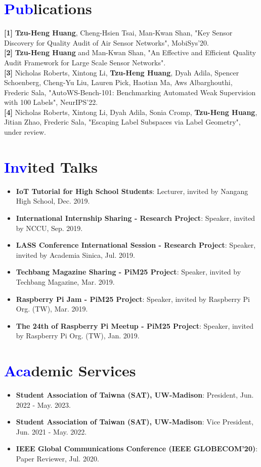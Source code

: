 \documentclass[letterpaper,11pt]{article}
\newcommand{\resumeItem}[2]{
  \item\small{
    \textbf{#1}{: #2 \vspace{-2pt}}
  }
}
\newcommand{\resumeSubItem}[2]{\resumeItem{#1}{#2}\vspace{-5pt}}
\newcommand{\resumeSubHeadingListStart}{\begin{itemize}[leftmargin=*]}
\newcommand{\resumeSubHeadingListEnd}{\end{itemize}}
\begin{document}
\section{\textbf{\textcolor{blue}{Pub}lications}}
{\textbf{[1]} \textbf{Tzu-Heng Huang}, Cheng-Hsien Tsai, Man-Kwan Shan, "Key Sensor Discovery for Quality Audit of Air Sensor Networks", MobiSys'20.} \\
{\textbf{[2]} \textbf{Tzu-Heng Huang} and Man-Kwan Shan, "An Effective and Efficient Quality Audit Framework for Large Scale Sensor Networks".} \\
{\textbf{[3]} Nicholas Roberts, Xintong Li, \textbf{Tzu-Heng Huang}, Dyah Adila, Spencer Schoenberg, Cheng-Yu Liu, Lauren Pick, Haotian Ma, Aws Albarghouthi, Frederic Sala, "AutoWS-Bench-101: Benchmarking Automated Weak Supervision with 100 Labels", NeurIPS'22.} \\
{\textbf{[4]} Nicholas Roberts, Xintong Li, Dyah Adila, Sonia Cromp, \textbf{Tzu-Heng Huang}, Jitian Zhao, Frederic Sala, "Escaping Label Subspaces via Label Geometry", under review.}

\section{\textbf{\textcolor{blue}{Inv}ited Talks}}
  \resumeSubHeadingListStart
    \resumeSubItem{IoT Tutorial for High School Students}{Lecturer, invited by Nangang High School, Dec. 2019.}
    \resumeSubItem{International Internship Sharing - Research Project}{Speaker, invited by NCCU, Sep. 2019.}
    \resumeSubItem{LASS Conference International Session - Research Project}{Speaker, invited by Academia Sinica, Jul. 2019.}
    \resumeSubItem{Techbang Magazine Sharing - PiM25 Project}{Speaker, invited by Techbang Magazine, Mar. 2019.}
    \resumeSubItem{Raspberry Pi Jam - PiM25 Project}{Speaker, invited by Raspberry Pi Org. (TW), Mar. 2019.}
    \resumeSubItem{The 24th of Raspberry Pi Meetup - PiM25 Project}{Speaker, invited by Raspberry Pi Org. (TW), Jan. 2019.}
  \resumeSubHeadingListEnd

\section{\textbf{\textcolor{blue}{Aca}demic Services}}
  \resumeSubHeadingListStart
    \resumeSubItem{Student Association of Taiwna (SAT), UW-Madison}{President, Jun. 2022 - May. 2023.}
    \resumeSubItem{Student Association of Taiwan (SAT), UW-Madison}{Vice President, Jun. 2021 - May. 2022.}
    \resumeSubItem{IEEE Global Communications Conference (IEEE GLOBECOM'20)}{Paper Reviewer, Jul. 2020.}
  \resumeSubHeadingListEnd
\end{document}
